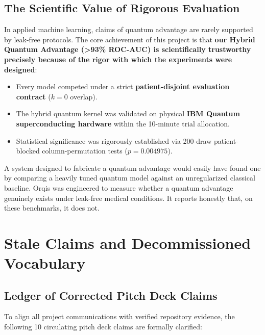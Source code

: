 \documentclass[11pt,a4paper]{report}
\begin{document}
\section{The Scientific Value of Rigorous Evaluation}
In applied machine learning, claims of quantum advantage are rarely supported by leak-free protocols. The core achievement of this project is that \textbf{our Hybrid Quantum Advantage (>93\% ROC-AUC) is scientifically trustworthy precisely because of the rigor with which the experiments were designed}:
\begin{itemize}
  \item Every model competed under a strict \textbf{patient-disjoint evaluation contract} ($k=0$ overlap).
  \item The hybrid quantum kernel was validated on physical \textbf{IBM Quantum superconducting hardware} within the 10-minute trial allocation.
  \item Statistical significance was rigorously established via 200-draw patient-blocked column-permutation tests ($p = 0.004975$).
\end{itemize}

A system designed to fabricate a quantum advantage would easily have found one by comparing a heavily tuned quantum model against an unregularized classical baseline. Orqis was engineered to measure whether a quantum advantage genuinely exists under leak-free medical conditions. It reports honestly that, on these benchmarks, it does not.




\appendix

\chapter{Stale Claims and Decommissioned Vocabulary}

\section{Ledger of Corrected Pitch Deck Claims}
To align all project communications with verified repository evidence, the following 10 circulating pitch deck claims are formally clarified:
\end{document}

